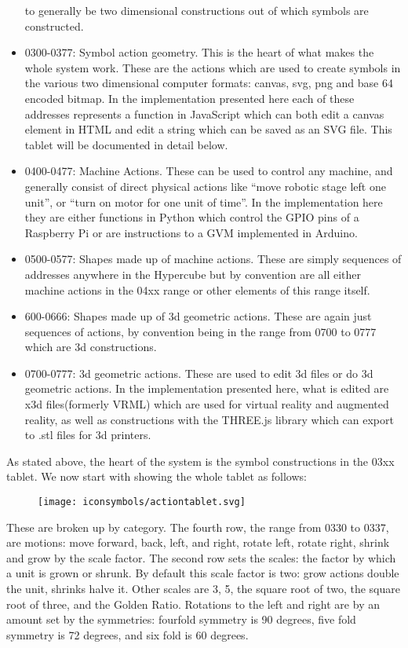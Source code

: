 \begin{itemize}
  to generally be two dimensional constructions out of which symbols are
  constructed.\\
\item
  0300-0377: Symbol action geometry. This is the heart of what makes the
  whole system work. These are the actions which are used to create
  symbols in the various two dimensional computer formats: canvas, svg,
  png and base 64 encoded bitmap. In the implementation presented here
  each of these addresses represents a function in JavaScript which can
  both edit a canvas element in HTML and edit a string which can be
  saved as an SVG file. This tablet will be documented in detail below.
\item
  0400-0477: Machine Actions. These can be used to control any machine,
  and generally consist of direct physical actions like ``move robotic
  stage left one unit'', or ``turn on motor for one unit of time''. In
  the implementation here they are either functions in Python which
  control the GPIO pins of a Raspberry Pi or are instructions to a GVM
  implemented in Arduino.\\
\item
  0500-0577: Shapes made up of machine actions. These are simply
  sequences of addresses anywhere in the Hypercube but by convention are
  all either machine actions in the 04xx range or other elements of this
  range itself.
\item
  600-0666: Shapes made up of 3d geometric actions. These are again just
  sequences of actions, by convention being in the range from 0700 to
  0777 which are 3d constructions.
\item
  0700-0777: 3d geometric actions. These are used to edit 3d files or do
  3d geometric actions. In the implementation presented here, what is
  edited are x3d files(formerly VRML) which are used for virtual reality
  and augmented reality, as well as constructions with the THREE.js
  library which can export to .stl files for 3d printers.
\end{itemize}

As stated above, the heart of the system is the symbol constructions in
the 03xx tablet. We now start with showing the whole tablet as follows:

\begin{figure}[htbp]
\centering
\texttt{[image: iconsymbols/actiontablet.svg]}
\caption{}
\end{figure}

These are broken up by category. The fourth row, the range from 0330 to
0337, are motions: move forward, back, left, and right, rotate left,
rotate right, shrink and grow by the scale factor. The second row sets
the scales: the factor by which a unit is grown or shrunk. By default
this scale factor is two: grow actions double the unit, shrinks halve
it. Other scales are 3, 5, the square root of two, the square root of
three, and the Golden Ratio. Rotations to the left and right are by an
amount set by the symmetries: fourfold symmetry is 90 degrees, five fold
symmetry is 72 degrees, and six fold is 60 degrees.

